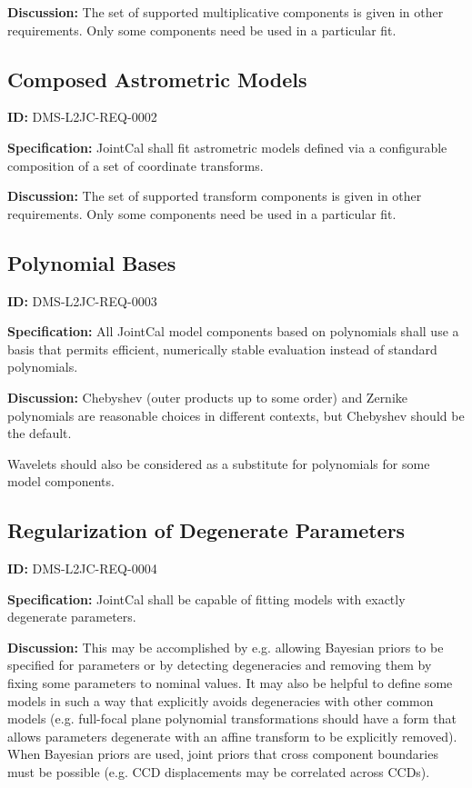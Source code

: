 \documentclass[SE,toc,lsstdraft]{lsstdoc}
\begin{document}
\textbf{Discussion:}
The set of supported multiplicative components is given in other requirements.  Only some components need be used in a particular fit.

\subsection{Composed Astrometric Models}

\label{DMS-L2JC-REQ-0002}
\textbf{ID:} DMS-L2JC-REQ-0002

\textbf{Specification:}
JointCal shall fit astrometric models defined via a configurable composition of a set of coordinate transforms.

\textbf{Discussion:}
The set of supported transform components is given in other requirements.  Only some components need be used in a particular fit.

\subsection{Polynomial Bases}

\label{DMS-L2JC-REQ-0003}
\textbf{ID:} DMS-L2JC-REQ-0003

\textbf{Specification:}
All JointCal model components based on polynomials shall use a basis that permits efficient, numerically stable evaluation instead of standard polynomials.

\textbf{Discussion:}
Chebyshev (outer products up to some order) and Zernike polynomials are reasonable choices in different contexts, but Chebyshev should be the default.

Wavelets should also be considered as a substitute for polynomials for some model components.

\subsection{Regularization of Degenerate Parameters}

\label{DMS-L2JC-REQ-0004}
\textbf{ID:} DMS-L2JC-REQ-0004

\textbf{Specification:}
JointCal shall be capable of fitting models with exactly degenerate parameters.

\textbf{Discussion:}
This may be accomplished by e.g. allowing Bayesian priors to be specified for parameters or by detecting degeneracies and removing them by fixing some parameters to nominal values.  It may also be helpful to define some models in such a way that explicitly avoids degeneracies with other common models (e.g. full-focal plane polynomial transformations should have a form that allows parameters degenerate with an affine transform to be explicitly removed).  When Bayesian priors are used, joint priors that cross component boundaries must be possible (e.g. CCD displacements may be correlated across CCDs).
\end{document}

